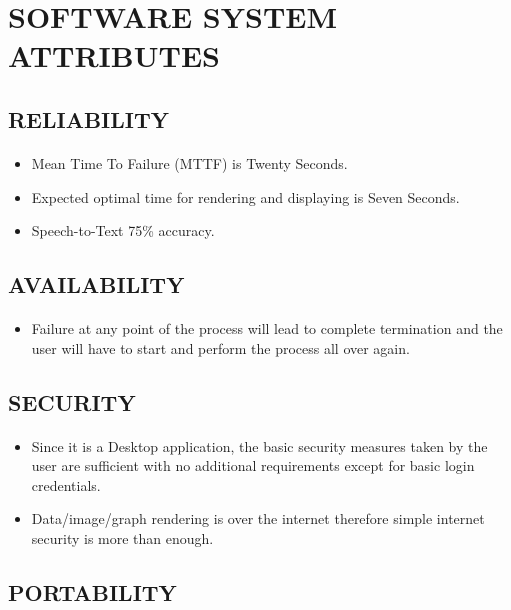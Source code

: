 \documentclass[12pt,a4paper,final,oneside]{report}
\begin{document}
\section{SOFTWARE SYSTEM ATTRIBUTES}
\subsection{RELIABILITY}
\paragraph{}
\begin{itemize}
  \item Mean Time To Failure (MTTF) is Twenty Seconds.
  \item Expected optimal time for rendering and displaying is Seven Seconds.
  \item Speech-to-Text 75\% accuracy.
\end{itemize}

\subsection{AVAILABILITY}
\paragraph{}
\begin{itemize}
  \item Failure at any point of the process will lead to complete termination and the user will have to start and perform the process all over again.
\end{itemize}

\subsection{SECURITY}
\paragraph{}
\begin{itemize}
  \item Since it is a Desktop application, the basic security measures taken by the user are sufficient with no additional requirements except for basic login credentials.
  \item Data/image/graph rendering is over the internet therefore simple internet security is more than enough.
\end{itemize}

\subsection{PORTABILITY}
\end{document}
